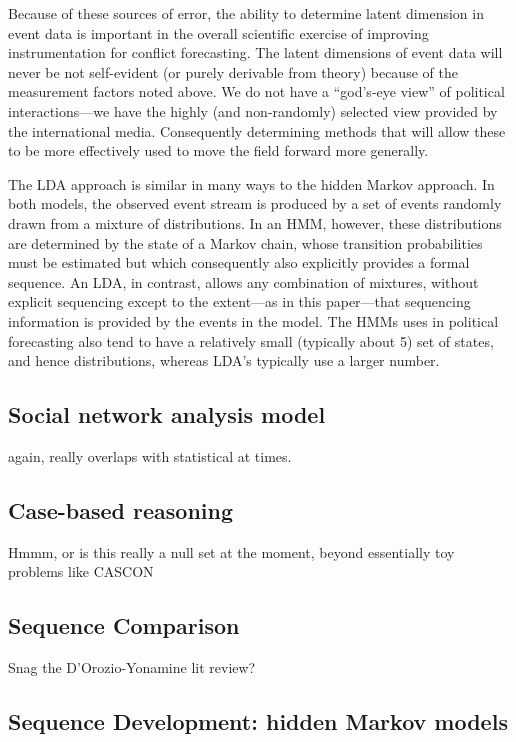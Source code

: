\documentclass[graybox]{svmult}
\begin{document}
Because of these sources of error, the ability to determine latent dimension in event data is important in the overall scientific exercise of improving instrumentation for conflict forecasting. The latent dimensions of event data will never be not self-evident (or purely derivable from theory) because of the measurement factors noted above. We do not have a ``god's-eye view'' of political interactions---we have the highly (and non-randomly) selected view provided by the international media. Consequently determining methods that will allow these to be more effectively used to move the field forward more generally.

The LDA approach is similar in many ways to the hidden Markov approach. In both models, the observed event stream is produced by a set of events randomly drawn from a mixture of distributions. In an HMM, however, these distributions are determined by the state of a Markov chain, whose transition probabilities must be estimated but which consequently also explicitly provides a formal sequence. An LDA, in contrast, allows any combination of mixtures, without explicit sequencing except to the extent---as in this paper---that sequencing information is provided by the events in the model. The HMMs uses in political forecasting also tend to have a relatively small (typically about 5) set of states, and hence distributions, whereas LDA's typically use a larger number. 


\subsection{Social network analysis model}
\label{sec:timeseries}

again, really overlaps with statistical at times.

\subsection{Case-based reasoning}
\label{sec:timeseries}

Hmmm, or is this really a null set at the moment, beyond essentially toy problems like CASCON

\subsection{Sequence Comparison}
\label{subsec:seqcompare}

Snag the D'Orozio-Yonamine lit review?

\subsection{Sequence Development: hidden Markov models}
\label{subsec:HMM}
\end{document}
